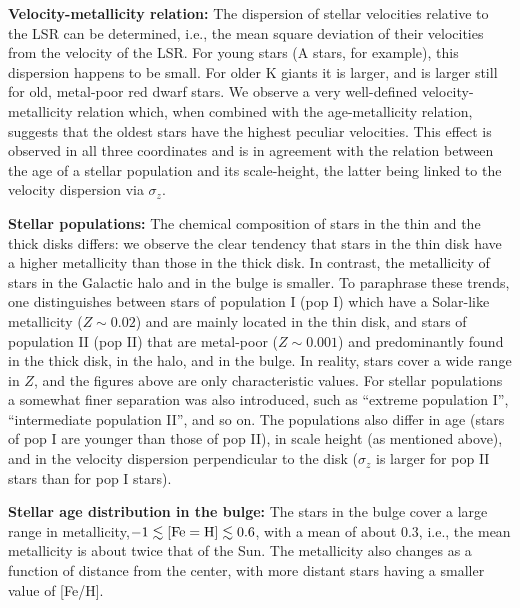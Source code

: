 \documentclass[a4paper,10pt]{article}
\begin{document}
{\noindent}\textbf{Velocity-metallicity relation:} The dispersion of stellar velocities relative to the LSR can be determined, i.e., the mean square deviation of their velocities from the velocity of the LSR. For young stars (A stars, for example), this dispersion happens to be small. For older K giants it is larger, and is larger still for old, metal-poor red dwarf stars. We observe a very well-defined velocity-metallicity relation which, when combined with the age-metallicity relation, suggests that the oldest stars have the highest peculiar velocities. This effect is observed in all three coordinates and is in agreement with the relation between the age of a stellar population and its scale-height, the latter being linked to the velocity dispersion via $\sigma_z$.

{\noindent}\textbf{Stellar populations:} The chemical composition of stars in the thin and the thick disks differs: we observe the clear tendency that stars in the thin disk have a higher metallicity than those in the thick disk. In contrast, the metallicity of stars in the Galactic halo and in the bulge is smaller. To paraphrase these trends, one distinguishes between stars of population I (pop I) which have a Solar-like metallicity ($Z\sim0.02$) and are mainly located in the thin disk, and stars of population II (pop II) that are metal-poor ($Z\sim0.001$) and predominantly found in the thick disk, in the halo, and in the bulge. In reality, stars cover a wide range in $Z$, and the figures above are only characteristic values. For stellar populations a somewhat finer separation was also introduced, such as ``extreme population I'', ``intermediate population II'', and so on. The populations also differ in age (stars of pop I are younger than those of pop II), in scale height (as mentioned above), and in the velocity dispersion perpendicular to the disk ($\sigma_z$ is larger for pop II stars than for pop I stars).

{\noindent}\textbf{Stellar age distribution in the bulge:} The stars in the bulge cover a large range in metallicity,$-1\lesssim {\rm [Fe=H]} \lesssim0.6$, with a mean of about $0.3$, i.e., the mean metallicity is about twice that of the Sun. The metallicity also changes as a function of distance from the center, with more distant stars having a smaller value of [Fe/H]. 
\end{document}
